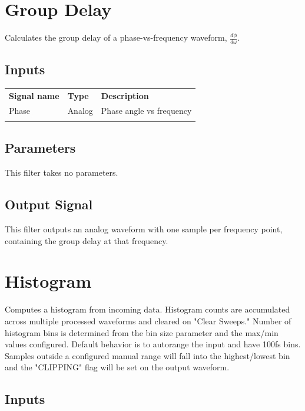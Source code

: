 \section{Group Delay}
\label{filter:groupdelay}

Calculates the group delay of a phase-vs-frequency waveform, $\frac{d\phi}{d\omega}$.

\subsection{Inputs}

\begin{tabularx}{16cm}{llX}
\thickhline
\textbf{Signal name} & \textbf{Type} & \textbf{Description} \\
\thickhline
Phase & Analog & Phase angle vs frequency\\
\thickhline
\end{tabularx}

\subsection{Parameters}

This filter takes no parameters.

\subsection{Output Signal}

This filter outputs an analog waveform with one sample per frequency point, containing the group delay at that
frequency.

\pagebreak
\section{Histogram}
\label{filter:histogram}

Computes a histogram from incoming data. Histogram counts are accumulated across multiple processed waveforms and cleared
on "Clear Sweeps." Number of histogram bins is determined from the bin size parameter and the max/min values configured.
Default behavior is to autorange the input and have 100fs bins. Samples outside a configured manual range will fall into
the highest/lowest bin and the "CLIPPING" flag will be set on the output waveform.

\subsection{Inputs}

